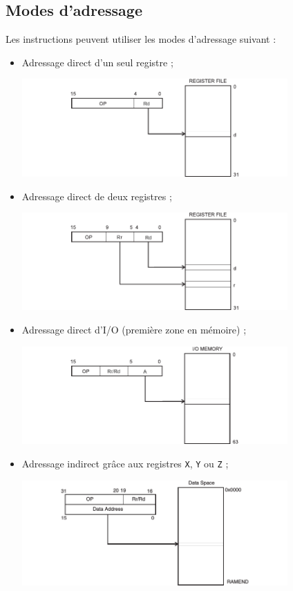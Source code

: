 \documentclass[11pt]{article}
\begin{document}
\subsection{Modes d'adressage}
Les instructions peuvent utiliser les modes d'adressage suivant :
\begin{itemize}
  \item Adressage direct d'un seul registre ;
   \begin{center}
     \includegraphics[width=0.8\textwidth]{images/direct_adressing.png}
   \end{center}
\pagebreak
  \item Adressage direct de deux registres ;
   \begin{center}
     \includegraphics[width=0.8\textwidth]{images/direct_adressing_double.png}
   \end{center}
  \item Adressage direct d'I/O (première zone en mémoire) ;
   \begin{center}
     \includegraphics[width=0.8\textwidth]{images/direct_adressing_IO.png}
   \end{center}
  \item Adressage indirect grâce aux registres \texttt{X}, \texttt{Y}
    ou \texttt{Z} ;
   \begin{center}
     \includegraphics[width=0.8\textwidth]{images/direct_data_adressing.png}

\end{center}
\end{itemize}
\end{document}
